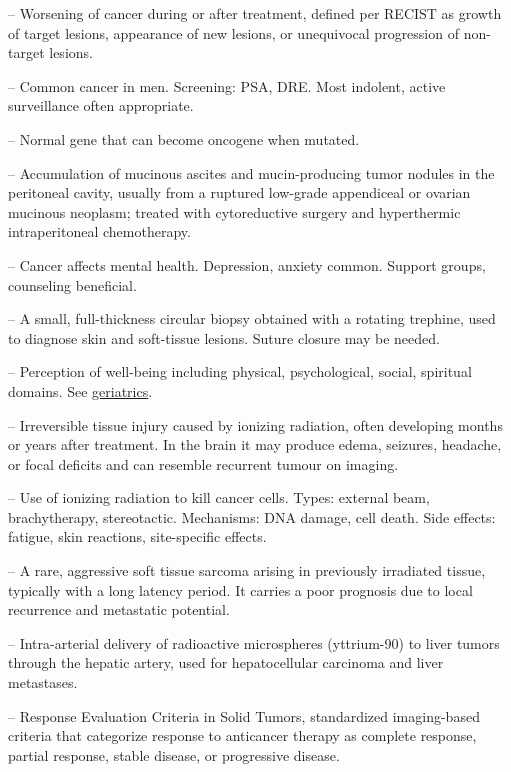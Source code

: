 -- Worsening of cancer during or after treatment, defined per RECIST as growth of target lesions, appearance of new lesions, or unequivocal progression of non-target lesions.

-- Common cancer in men. Screening: PSA, DRE. Most indolent, active surveillance often appropriate.

-- Normal gene that can become oncogene when mutated.

-- Accumulation of mucinous ascites and mucin-producing tumor nodules in the peritoneal cavity, usually from a ruptured low-grade appendiceal or ovarian mucinous neoplasm; treated with cytoreductive surgery and hyperthermic intraperitoneal chemotherapy.

-- Cancer affects mental health. Depression, anxiety common. Support groups, counseling beneficial.

-- A small, full-thickness circular biopsy obtained with a rotating trephine, used to diagnose skin and soft-tissue lesions. Suture closure may be needed.

-- Perception of well-being including physical, psychological, social, spiritual domains. See \hyperlink{Geriatrics}{geriatrics}.

-- Irreversible tissue injury caused by ionizing radiation, often developing months or years after treatment. In the brain it may produce edema, seizures, headache, or focal deficits and can resemble recurrent tumour on imaging.

-- Use of ionizing radiation to kill cancer cells. Types: external beam, brachytherapy, stereotactic. Mechanisms: DNA damage, cell death. Side effects: fatigue, skin reactions, site-specific effects.

-- A rare, aggressive soft tissue sarcoma arising in previously irradiated tissue, typically with a long latency period. It carries a poor prognosis due to local recurrence and metastatic potential.

-- Intra-arterial delivery of radioactive microspheres (yttrium-90) to liver tumors through the hepatic artery, used for hepatocellular carcinoma and liver metastases.

-- Response Evaluation Criteria in Solid Tumors, standardized imaging-based criteria that categorize response to anticancer therapy as complete response, partial response, stable disease, or progressive disease.

